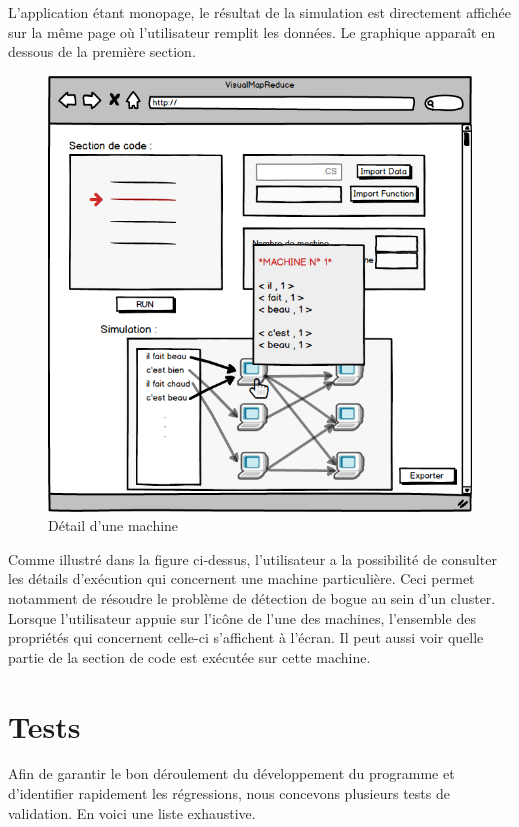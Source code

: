 \documentclass[12pt,a4paper]{article}
\begin{document}
L'application étant monopage, le résultat de la simulation est directement affichée sur la même page où l'utilisateur remplit les données. Le graphique apparaît en dessous de la première section.

\begin{figure}[H]
  \centering
    \includegraphics[width=1\textwidth]{images/interface/page_interpret3.png}
    \caption{Détail d'une machine}
\end{figure}

Comme illustré dans la figure ci-dessus, l'utilisateur a la possibilité de consulter les détails d'exécution qui concernent une machine particulière. Ceci permet notamment de résoudre le problème de détection de bogue au sein d'un cluster. Lorsque l'utilisateur appuie sur l'icône de l'une des machines, l'ensemble des propriétés qui concernent celle-ci s'affichent à l'écran. Il peut aussi voir quelle partie de la section de code est exécutée sur cette machine.
\newpage
\section{Tests}
Afin de garantir le bon déroulement du développement du programme et d'identifier rapidement les régressions, nous concevons plusieurs tests de validation.
En voici une liste exhaustive.
\vspace{0.8pt}
\end{document}
